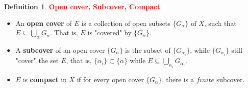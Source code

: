 \documentclass[12pt,a4paper]{article}
\theoremstyle{definition}
\newtheorem{dfn}[thm]{Definition}
\begin{document}
\begin{dfn} \textcolor{RED}{\bf Open cover, Subcover, Compact}
    \begin{itemize} Let $X$ be a metric space, subset $E \subset X$:
        \item An {\bf open cover} of $E$ is a collection of open subsets $\{G_{\alpha}\}$ of $X$, such that $E \subseteq \bigcup_{\alpha}G_{\alpha}$. That is, $E$ is "covered" by $\{G_{\alpha}\}$.
        \item A {\bf subcover} of an open cover $\{G_{\alpha}\}$ is the subset of $\{G_{\alpha_{i}}\}$, while $\{G_{\alpha_{i}}\}$ still "cover" the set $E$, that is, $\{\alpha_{i}\}\subset \{\alpha\}$ while $E \subseteq \bigcup_{\alpha_{i}}G_{\alpha_{i}}$.
        \item $E$ is {\bf compact} in $X$ if for every open cover $\{G_{\alpha}\}$, there is a $finite$ subcover.
    \end{itemize}
\end{dfn}
\end{document}
